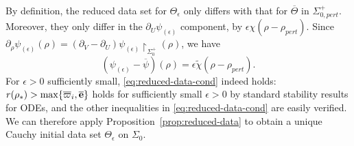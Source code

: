 \documentclass[10pt, reqno]{amsart}
\theoremstyle{definition}
\theoremstyle{remark}
\theoremstyle{conjecture}
\numberwithin{equation}{section}
\newcommand{\set}[1]{\{#1\}}
\newcommand{\rd}{\partial}
\newcommand{\0}{\emptyset}
\newcommand{\eps}{\epsilon}
\newcommand{\Sgm}{\Sigma}
\newcommand{\Tht}{\Theta}
\newcommand{\bfe}{{\bf e}}
\newcommand{\e}{\bfe}							%
\newcommand{\psibg}{\overline{\psi}}				%
\newcommand{\varpibg}{\overline{\varpi}}				%
\newcommand{\ebg}{\overline{\e}}					%
\begin{document}
By definition, the reduced data set for $\Tht_{\eps}$ only differs with that for $\overline{\Tht}$ in $\Sgm_{0, pert}^{+}$. Moreover, they only differ in the $\rd_{U} \psi_{(\eps)}$ component, by $\eps \chi(\rho - \rho_{pert})$. Since $\rd_{\rho} \psi_{(\eps)}(\rho) = (\rd_{V} - \rd_{U} ) \psi_{(\eps)} \restriction_{\Sgm_{0}^{+}} (\rho)$, we have
\begin{equation} \label{eq:inst:psi-eps}
	(\psi_{(\eps)} - \psibg )(\rho) = \eps \tilde{\chi}(\rho-\rho_{pert}).
\end{equation}
For $\eps>0$ sufficiently small, \eqref{eq:reduced-data-cond} indeed holds: $r(\rho_*) > \max \set{\varpibg_{i}, \ebg}$ holds for sufficiently small $\eps>0$ by standard stability results for ODEs, and the other inequalities in \eqref{eq:reduced-data-cond} are easily verified. We can therefore apply Proposition~\ref{prop:reduced-data} to obtain a unique Cauchy initial data set $\Tht_\eps$ on $\Sgm_0$.
\end{document}
